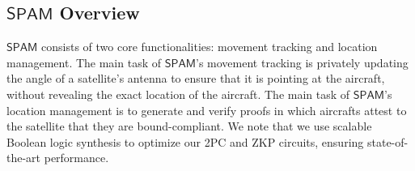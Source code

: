\documentclass[9pt,sigconf,screen]{acmart}
\newcommand{\yaman}[1]{\textcolor{blue}{{\sf (YJ:} {\sl{#1})}}}
\newcommand\sys{$\mathsf{SPAM}$\xspace}
\begin{document}




\subsection{\sys Overview}
\sys consists of two core functionalities: movement tracking and location management.
The main task of \sys's movement tracking is privately updating the angle of a satellite's antenna to ensure that it is pointing at the aircraft, without revealing the exact location of the aircraft. The main task of \sys's location management is to generate and verify proofs in which aircrafts attest to the satellite that they are bound-compliant. We note that we use scalable Boolean logic synthesis \cite{emp, tg} to optimize our 2PC and ZKP circuits, ensuring state-of-the-art performance.
\end{document}
